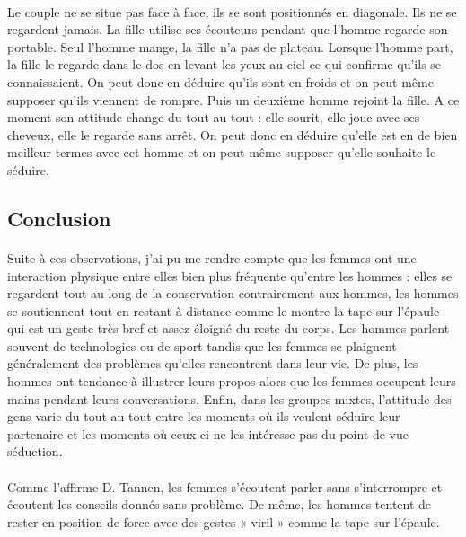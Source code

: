 \paragraph{}
	Le couple ne se situe pas face à face, ils se sont positionnés en diagonale. Ils ne se regardent jamais. La fille utilise ses écouteurs pendant que l’homme regarde son portable. Seul l’homme mange, la fille n’a pas de plateau. Lorsque l’homme part, la fille le regarde dans le dos en levant les yeux au ciel ce qui confirme qu’ils se connaissaient. On peut donc en déduire qu’ils sont en froids et on peut même supposer qu’ils viennent de rompre. Puis un deuxième homme rejoint la fille. A ce moment son attitude change du tout au tout : elle sourit, elle joue avec ses cheveux, elle le regarde sans arrêt. On peut donc en déduire qu’elle est en de bien meilleur termes avec cet homme et on peut même supposer qu’elle souhaite le séduire.
	
\subsection{Conclusion}
\paragraph{}
Suite à ces observations, j’ai pu me rendre compte que les femmes ont une interaction physique entre elles bien plus fréquente qu’entre les hommes : elles se regardent tout au long de la conservation contrairement aux hommes, les hommes se soutiennent tout en restant à distance comme le montre la tape sur l’épaule qui est un geste très bref et assez éloigné du reste du corps. Les hommes parlent souvent de technologies ou de sport tandis que les femmes se plaignent généralement des problèmes qu’elles rencontrent dans leur vie. De plus, les hommes ont tendance à illustrer leurs propos alors que les femmes occupent leurs mains pendant leurs conversations. Enfin, dans les groupes mixtes, l’attitude des gens varie du tout au tout entre les moments où ils veulent séduire leur partenaire et les moments où ceux-ci ne les intéresse pas du point de vue séduction.
\paragraph{}
Comme l’affirme D. Tannen, les femmes s’écoutent parler sans s’interrompre et écoutent les conseils donnés sans problème. De même, les hommes tentent de rester en position de force avec des gestes « viril » comme la tape sur l’épaule.

